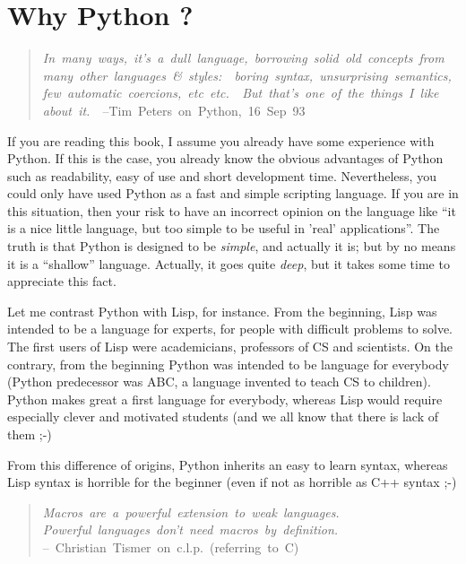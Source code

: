 \documentclass[11pt,english]{book}
\begin{document}
\hypertarget{why-python}{}
\section{Why Python ?}
\begin{quote}
\begin{flushleft}
\emph{In~many~ways,~it's~a~dull~language,~borrowing~solid~old~concepts~from~~\\
many~other~languages~{\&}~styles:~~boring~syntax,~unsurprising~semantics,~\\
few~automatic~coercions,~etc~etc.~~But~that's~one~of~the~things~I~like~\\
about~it.}~~--Tim~Peters~on~Python,~16~Sep~93
\end{flushleft}
\end{quote}

If you are reading this book, I assume you already  have some experience
with Python. If this is the case, you already know the obvious advantages
of Python such as readability, easy of use and short development time.
Nevertheless, you could only have used Python as a fast and simple
scripting language. If you are in this situation, then your risk to
have an incorrect opinion on the language like ``it is a nice little
language, but too simple to be useful in 'real' applications''. The
truth is that Python is designed to be \emph{simple}, and actually it
is; but by no means it is a ``shallow'' language. Actually, it goes
quite \emph{deep}, but it takes some time to appreciate this fact.

Let me contrast Python with Lisp, for instance. From the beginning,
Lisp was intended to be a language for experts, for people with difficult 
problems to solve. The first
users of Lisp were academicians, professors of CS and scientists.
On the contrary, from the beginning Python 
was intended to be language for everybody (Python predecessor was ABC, 
a language invented to teach CS to children). Python makes great a first 
language for everybody, whereas Lisp would require especially
clever and motivated students (and we all know that there is lack
of them ;-)

From this difference of origins, Python inherits an easy to learn syntax,
whereas Lisp syntax is horrible for the beginner (even if not as
horrible as C++ syntax ;-)
\begin{quote}
\begin{flushleft}
\emph{Macros~are~a~powerful~extension~to~weak~languages.~\\
Powerful~languages~don't~need~macros~by~definition.}~~\\
--~Christian~Tismer~on~c.l.p.~(referring~to~C)
\end{flushleft}
\end{quote}
\end{document}
